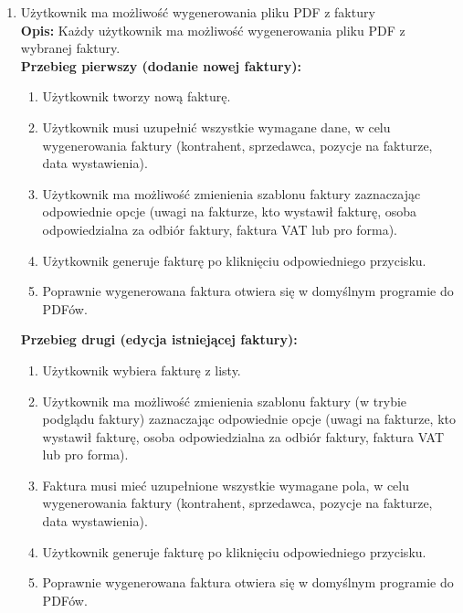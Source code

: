 \begin{enumerate}
    \item Użytkownik ma możliwość wygenerowania pliku PDF z faktury \\
    \textbf{Opis: } Każdy użytkownik ma możliwość wygenerowania pliku PDF z wybranej faktury. \\
    \textbf{Przebieg pierwszy (dodanie nowej faktury): }
    \begin{enumerate}
        \item Użytkownik tworzy nową fakturę.
        \item Użytkownik musi uzupełnić wszystkie wymagane dane, w celu wygenerowania faktury (kontrahent, sprzedawca, pozycje na fakturze, data wystawienia).
        \item Użytkownik ma możliwość zmienienia szablonu faktury zaznaczając odpowiednie opcje (uwagi na fakturze, kto wystawił fakturę, osoba odpowiedzialna za odbiór faktury, faktura VAT lub pro forma).
        \item Użytkownik generuje fakturę po kliknięciu odpowiedniego przycisku.
        \item Poprawnie wygenerowana faktura otwiera się w domyślnym programie do PDFów.
    \end{enumerate}
    \textbf{Przebieg drugi (edycja istniejącej faktury): }
    \begin{enumerate}
        \item Użytkownik wybiera fakturę z listy.
        \item Użytkownik ma możliwość zmienienia szablonu faktury (w trybie podglądu faktury) zaznaczając odpowiednie opcje (uwagi na fakturze, kto wystawił fakturę, osoba odpowiedzialna za odbiór faktury, faktura VAT lub pro forma).
        \item Faktura musi mieć uzupełnione wszystkie wymagane pola, w celu wygenerowania faktury (kontrahent, sprzedawca, pozycje na fakturze, data wystawienia).
        \item Użytkownik generuje fakturę po kliknięciu odpowiedniego przycisku.
        \item Poprawnie wygenerowana faktura otwiera się w domyślnym programie do PDFów.
    \end{enumerate}
\end{enumerate}

